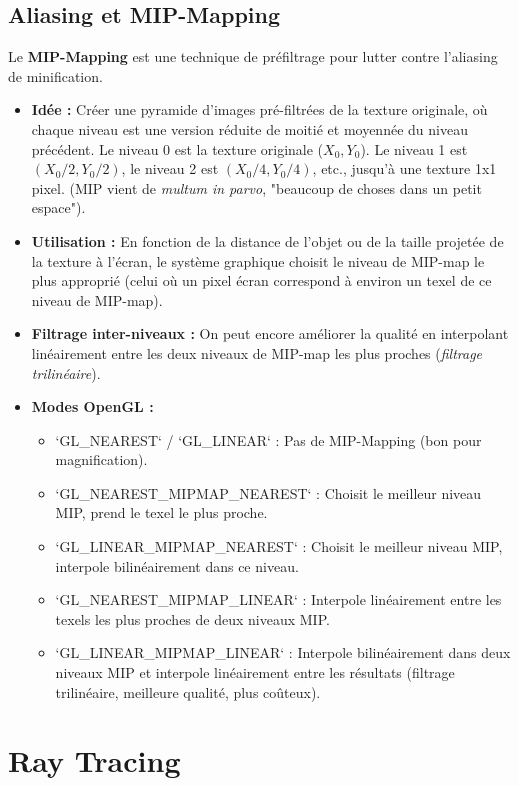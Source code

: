 \documentclass{article}
\begin{document}
\subsection{Aliasing et MIP-Mapping}
Le \textbf{MIP-Mapping} est une technique de préfiltrage pour lutter contre l'aliasing de minification.
\begin{itemize}
    \item \textbf{Idée :} Créer une pyramide d'images pré-filtrées de la texture originale, où chaque niveau est une version réduite de moitié et moyennée du niveau précédent. Le niveau 0 est la texture originale ($X_0, Y_0$). Le niveau 1 est $(X_0/2, Y_0/2)$, le niveau 2 est $(X_0/4, Y_0/4)$, etc., jusqu'à une texture 1x1 pixel. (MIP vient de \textit{multum in parvo}, "beaucoup de choses dans un petit espace").
    \item \textbf{Utilisation :} En fonction de la distance de l'objet ou de la taille projetée de la texture à l'écran, le système graphique choisit le niveau de MIP-map le plus approprié (celui où un pixel écran correspond à environ un texel de ce niveau de MIP-map).
    \item \textbf{Filtrage inter-niveaux :} On peut encore améliorer la qualité en interpolant linéairement entre les deux niveaux de MIP-map les plus proches (\textit{filtrage trilinéaire}).
    \item \textbf{Modes OpenGL :}
        \begin{itemize}
            \item `GL_NEAREST` / `GL_LINEAR` : Pas de MIP-Mapping (bon pour magnification).
            \item `GL_NEAREST_MIPMAP_NEAREST` : Choisit le meilleur niveau MIP, prend le texel le plus proche.
            \item `GL_LINEAR_MIPMAP_NEAREST` : Choisit le meilleur niveau MIP, interpole bilinéairement dans ce niveau.
            \item `GL_NEAREST_MIPMAP_LINEAR` : Interpole linéairement entre les texels les plus proches de deux niveaux MIP.
            \item `GL_LINEAR_MIPMAP_LINEAR` : Interpole bilinéairement dans deux niveaux MIP et interpole linéairement entre les résultats (filtrage trilinéaire, meilleure qualité, plus coûteux).
        \end{itemize}
\end{itemize}

\section{Ray Tracing}
\end{document}
